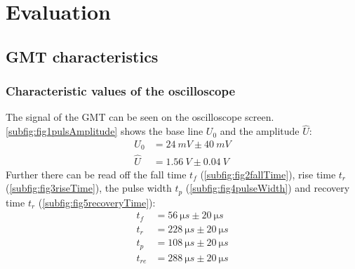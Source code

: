 \chapter{Evaluation}
%
\section{GMT characteristics}
%
\subsection{Characteristic values of the oscilloscope}
%
The signal of the GMT can be seen on the oscilloscope screen. \cref{subfig:fig1pulsAmplitude} shows the base line \(U_{0}\) and
the amplitude \(\hat{U}\):
%
\begin{align}
U_{0}   &=  \SI{24}{mV} \pm \SI{40}{mV} \\
\hat{U} &=  \SI{1,56}{V} \pm \SI{0,04}{V}
\end{align}
%
Further there can be read off the fall time \(t_{f}\) (\cref{subfig:fig2fallTime}), rise time \(t_{r}\) (\cref{subfig:fig3riseTime}), the pulse width \(t_{p}\)
(\cref{subfig:fig4pulseWidth}) and recovery time \(t_{r}\) (\cref{subfig:fig5recoveryTime}):
\begin{align}
t_{f}   &=  \SI{56}{\micro s} \pm \SI{20}{\micro s} \\
t_{r}   &=  \SI{228}{\micro s} \pm \SI{20}{\micro s} \\
t_{p}   &=  \SI{108}{\micro s} \pm \SI{20}{\micro s} \\
t_{re}  &=  \SI{288}{\micro s} \pm \SI{20}{\micro s}
\end{align}
%

